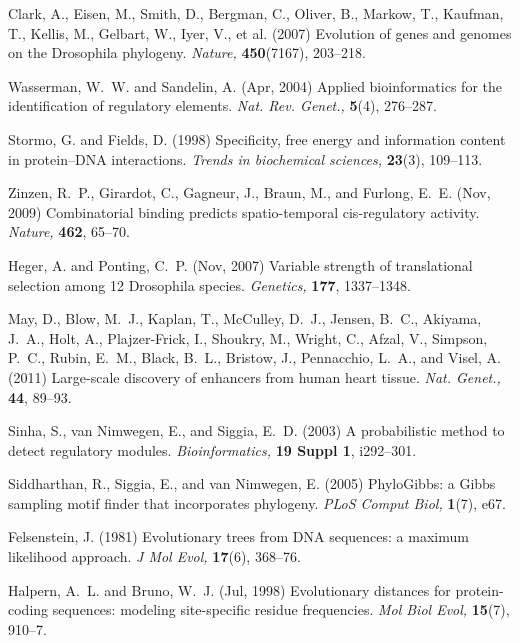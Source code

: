 \documentclass[a4,center,fleqn]{NAR}
\begin{document}
\begin{thebibliography}{10}
Clark, A., Eisen, M., Smith, D., Bergman, C., Oliver, B., Markow, T., Kaufman,
  T., Kellis, M., Gelbart, W., Iyer, V., et al. (2007)
{Evolution of genes and genomes on the Drosophila phylogeny}.
{\em Nature,} {\bf 450}(7167), 203--218.

Wasserman, W.~W. and Sandelin, A. (Apr, 2004)
{{A}pplied bioinformatics for the identification of regulatory elements}.
{\em Nat. Rev. Genet.,} {\bf 5}(4), 276--287.

Stormo, G. and Fields, D. (1998)
{Specificity, free energy and information content in protein--DNA
  interactions}.
{\em Trends in biochemical sciences,} {\bf 23}(3), 109--113.

Zinzen, R.~P., Girardot, C., Gagneur, J., Braun, M., and Furlong, E.~E. (Nov,
  2009)
{{C}ombinatorial binding predicts spatio-temporal cis-regulatory activity}.
{\em Nature,} {\bf 462}, 65--70.

Heger, A. and Ponting, C.~P. (Nov, 2007)
{{V}ariable strength of translational selection among 12 {D}rosophila species}.
{\em Genetics,} {\bf 177}, 1337--1348.

May, D., Blow, M.~J., Kaplan, T., McCulley, D.~J., Jensen, B.~C., Akiyama,
  J.~A., Holt, A., Plajzer-Frick, I., Shoukry, M., Wright, C., Afzal, V.,
  Simpson, P.~C., Rubin, E.~M., Black, B.~L., Bristow, J., Pennacchio, L.~A.,
  and Visel, A. (2011)
{{L}arge-scale discovery of enhancers from human heart tissue}.
{\em Nat. Genet.,} {\bf 44}, 89--93.

Sinha, S., van Nimwegen, E., and Siggia, E.~D. (2003)
A probabilistic method to detect regulatory modules.
{\em Bioinformatics,} {\bf 19 Suppl 1}, i292--301.

Siddharthan, R., Siggia, E., and van Nimwegen, E. (2005)
{PhyloGibbs: a Gibbs sampling motif finder that incorporates phylogeny}.
{\em PLoS Comput Biol,} {\bf 1}(7), e67.

Felsenstein, J. (1981)
Evolutionary trees from DNA sequences: a maximum likelihood approach.
{\em J Mol Evol,} {\bf 17}(6), 368--76.

Halpern, A.~L. and Bruno, W.~J. (Jul, 1998)
Evolutionary distances for protein-coding sequences: modeling site-specific
  residue frequencies.
{\em Mol Biol Evol,} {\bf 15}(7), 910--7.


\end{thebibliography}
\end{document}

